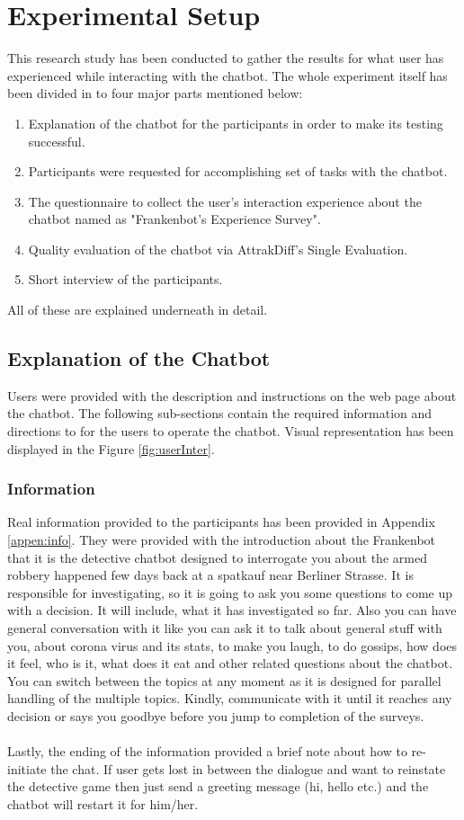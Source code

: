 \section{Experimental Setup}
This research study has been conducted to gather the results for what user has experienced while interacting with the chatbot. The whole experiment itself has been divided in to four major parts mentioned below:
\begin{enumerate}
    \item Explanation of the chatbot for the participants in order to make its testing successful.
    \item Participants were requested for accomplishing set of tasks with the chatbot.
    \item The questionnaire to collect the user's interaction experience about the chatbot named as "Frankenbot's Experience Survey".
    \item Quality evaluation of the chatbot via AttrakDiff's Single Evaluation.
    \item Short interview of the participants.
\end{enumerate} 
All of these are explained underneath in detail.

\subsection{Explanation of the Chatbot}
Users were provided with the description and instructions on the web page about the chatbot. The following sub-sections contain the required information and directions to for the users to operate the chatbot. Visual representation has been displayed in the Figure \ref{fig:userInter}.

\subsubsection*{Information}
Real information provided to the participants has been provided in Appendix \ref{appen:info}. They were provided with the introduction about the Frankenbot that it is the detective chatbot designed to interrogate you about the armed robbery happened few days back at a spatkauf near Berliner Strasse. It is responsible for investigating, so it is going to ask you some questions to come up with a decision. It will include, what it has investigated so far. Also you can have general conversation with it like you can ask it to talk about general stuff with you, about corona virus and its stats, to make you laugh, to do gossips, how does it feel, who is it, what does it eat and other related questions about the chatbot. You can switch between the topics at any moment as it is designed for parallel handling of the multiple topics. Kindly, communicate with it until it reaches any decision or says you goodbye before you jump to completion of the surveys.
\\~\\
Lastly, the ending of the information provided a brief note about how to re-initiate the chat. If user gets lost in between the dialogue and want to reinstate the detective game then just send a greeting message (hi, hello etc.) and the chatbot will restart it for him/her. 

